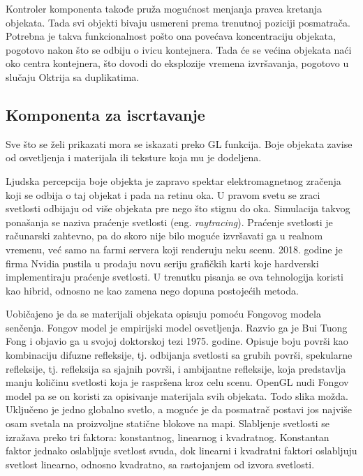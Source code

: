 \documentclass[12pt,oneside]{memoir}
\begin{document}
Kontroler komponenta takođe pruža mogućnost menjanja pravca kretanja objekata. 
Tada svi objekti bivaju usmereni prema trenutnoj poziciji posmatrača. 
Potrebna je takva funkcionalnost pošto ona povećava koncentraciju objekata, 
pogotovo nakon što se odbiju o ivicu kontejnera. Tada će se većina objekata 
naći oko centra kontejnera, što dovodi do eksplozije vremena izvršavanja, pogotovo u slučaju Oktrija sa duplikatima.

\subsection{Komponenta za iscrtavanje}

Sve što se želi prikazati mora se iskazati preko GL funkcija. 
Boje objekata zavise od osvetljenja i materijala ili teksture koja mu je dodeljena.

Ljudska percepcija boje objekta je zapravo spektar elektromagnetnog zračenja koji se odbija o taj objekat i pada na retinu oka.
U pravom svetu se zraci svetlosti odbijaju od više objekata pre nego što stignu do oka. 
Simulacija takvog ponašanja se naziva praćenje svetlosti (eng. {\em raytracing}).  
Praćenje svetlosti je računarski zahtevno, pa do skoro nije bilo moguće izvršavati ga u realnom vremenu, već samo na farmi servera koji renderuju neku scenu.
2018. godine je firma Nvidia pustila u prodaju novu seriju grafičkih karti koje hardverski implementiraju praćenje svetlosti. 
U trenutku pisanja se ova tehnologija koristi kao hibrid, odnosno ne kao zamena nego dopuna postojećih metoda.

Uobičajeno je da se materijali objekata opisuju pomoću Fongovog modela senčenja. 
Fongov model je empirijski model osvetljenja. Razvio ga je Bui Tuong Fong i objavio ga u svojoj doktorskoj tezi 1975. godine.
Opisuje boju površi kao kombinaciju difuzne refleksije, tj. odbijanja svetlosti sa grubih površi, 
spekularne refleksije, tj. refleksija sa sjajnih površi, i ambijantne refleksije, koja predstavlja manju količinu svetlosti 
koja je raspršena kroz celu scenu.
\cite{Phong} OpenGL nudi Fongov model pa se on koristi za opisivanje materijala svih objekata.
Todo slika možda.
Uključeno je jedno globalno svetlo, a moguće je da posmatrač postavi jos najviše osam svetala na 
proizvoljne statične blokove na mapi. 
Slabljenje svetlosti se izražava preko tri faktora: konstantnog, linearnog i kvadratnog.
Konstantan faktor jednako oslabljuje svetlost svuda, dok linearni i kvadratni faktori oslabljuju svetlost
linearno, odnosno kvadratno, sa rastojanjem od izvora svetlosti.
\end{document}
